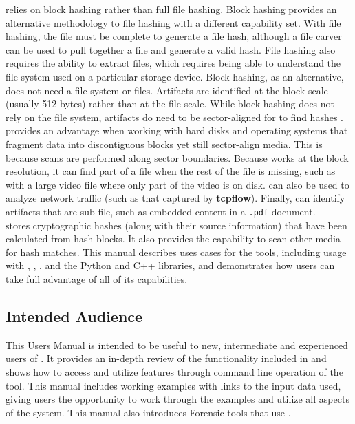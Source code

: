 \documentclass[11pt,fleqn]{article} %
\begin{document}
\hdb relies on block hashing rather than full file hashing. Block hashing provides an alternative methodology to file hashing with a different capability set. With file hashing, the file must be complete to generate a file hash, although a file carver can be used to pull together a file and generate a valid hash.  File hashing also requires the ability to extract files, which requires being able to understand the file system used on a particular storage device. Block hashing, as an alternative, does not need a file system or files. Artifacts are identified at the block scale (usually 512 bytes) rather than at the file scale. While block hashing does not rely on the file system, artifacts do need to be sector-aligned for \hdb to find hashes \cite{hashEncoding}.\\

\hdb provides an advantage when working with hard disks and operating systems that fragment data into discontiguous blocks yet still sector-align media. This is because scans are performed along sector boundaries. Because \hdb works at the block resolution, it can find part of a file when the rest of the file is missing, such as with a large video file where only part of the video is on disk. \hdb can also be used to analyze network traffic (such as that captured by \textbf{tcpflow}).  Finally, \hdb can identify artifacts that are sub-file, such as embedded content in a \texttt{.pdf} document.\\

\hdb stores cryptographic hashes (along with their source information) that have been calculated from hash blocks. It also provides the capability to scan other media for hash matches.
This manual describes uses cases for the \hdb tools, including usage with \aut, \sscope, \bulk, and the \hdb Python and C++ libraries, and demonstrates how users can take full advantage of all of its capabilities.

\subsection{Intended Audience}
This Users Manual is intended to be useful to new, intermediate and experienced users of \hdb. It provides an in-depth review of the functionality included in \hdb and shows how to access and utilize features through command line operation of the tool. This manual includes working examples with links to the input data used, giving users the opportunity to work through the examples and utilize all aspects of the system.  This manual also introduces Forensic tools that use \hdb.\\
\end{document}
